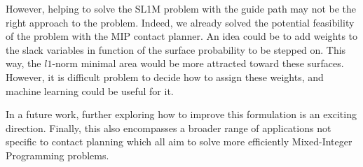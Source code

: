 However, helping to solve the SL1M problem with the guide path may not be the right approach to the problem.
Indeed, we already solved the potential feasibility of the problem with the MIP contact planner.
An idea could be to add weights to the slack variables in function of the surface probability to be stepped on.
This way, the $l1$-norm minimal area would be more attracted toward these surfaces. However, it is difficult problem to decide how to assign these weights, and machine learning could be useful for it.

In a future work, further exploring how to improve this formulation is an exciting direction. 
Finally, this also encompasses a broader range of applications not specific to contact planning which all aim to solve more efficiently Mixed-Integer Programming problems.